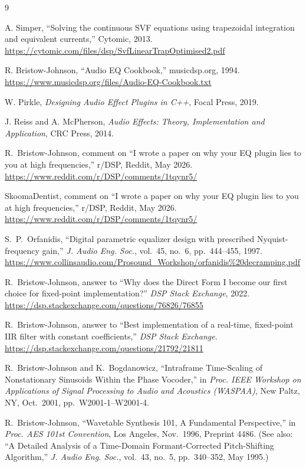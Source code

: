 \documentclass[twocolumn]{article}
\begin{document}
\begin{thebibliography}{9}

A. Simper, ``Solving the continuous SVF equations using trapezoidal integration and equivalent currents,'' Cytomic, 2013.
\url{https://cytomic.com/files/dsp/SvfLinearTrapOptimised2.pdf}

R. Bristow-Johnson, ``Audio EQ Cookbook,'' musicdsp.org, 1994.
\url{https://www.musicdsp.org/files/Audio-EQ-Cookbook.txt}

W. Pirkle, \textit{Designing Audio Effect Plugins in C++}, Focal Press, 2019.

J. Reiss and A. McPherson, \textit{Audio Effects: Theory, Implementation and Application}, CRC Press, 2014.


R.~Bristow-Johnson, comment on ``I wrote a paper on why your EQ plugin lies to you at high frequencies,'' r/DSP, Reddit, May 2026.
\url{https://www.reddit.com/r/DSP/comments/1tqynr5/}

SkoomaDentist, comment on ``I wrote a paper on why your EQ plugin lies to you at high frequencies,'' r/DSP, Reddit, May 2026.
\url{https://www.reddit.com/r/DSP/comments/1tqynr5/}

S.~P.~Orfanidis, ``Digital parametric equalizer design with prescribed Nyquist-frequency gain,''
\textit{J. Audio Eng. Soc.}, vol.~45, no.~6, pp.~444--455, 1997.
\url{https://www.collinsaudio.com/Prosound_Workshop/orfanidis\%20decramping.pdf}

R.~Bristow-Johnson, answer to ``Why does the Direct Form I become our first choice for fixed-point implementation?''
\textit{DSP Stack Exchange}, 2022.
\url{https://dsp.stackexchange.com/questions/76826/76855}

R.~Bristow-Johnson, answer to ``Best implementation of a real-time, fixed-point IIR filter with constant coefficients,''
\textit{DSP Stack Exchange}.
\url{https://dsp.stackexchange.com/questions/21792/21811}

R.~Bristow-Johnson and K.~Bogdanowicz, ``Intraframe Time-Scaling of Nonstationary Sinusoids Within the Phase Vocoder,''
in \textit{Proc. IEEE Workshop on Applications of Signal Processing to Audio and Acoustics (WASPAA)},
New Paltz, NY, Oct.\ 2001, pp.~W2001-1--W2001-4.

R.~Bristow-Johnson, ``Wavetable Synthesis 101, A Fundamental Perspective,''
in \textit{Proc. AES 101st Convention}, Los Angeles, Nov.\ 1996, Preprint 4486.
(See also: ``A Detailed Analysis of a Time-Domain Formant-Corrected
Pitch-Shifting Algorithm,'' \textit{J. Audio Eng. Soc.}, vol.~43, no.~5,
pp.~340--352, May 1995.)
\end{thebibliography}
\end{document}
